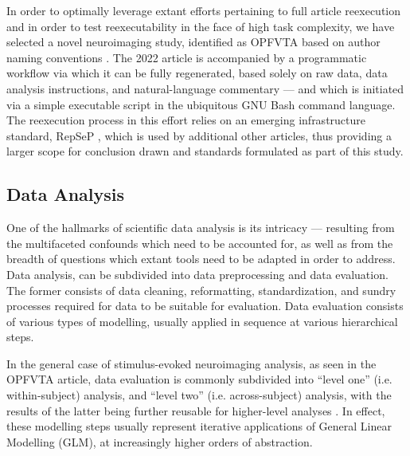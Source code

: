 In order to optimally leverage extant efforts pertaining to full article reexecution and in order to test reexecutability in the face of high task complexity, we have selected a novel neuroimaging study, identified as OPFVTA based on author naming conventions \supercite{opfvta}.
The 2022 article is accompanied by a programmatic workflow via which it can be fully regenerated, based solely on raw data, data analysis instructions, and natural-language commentary — and which is initiated via a simple executable script in the ubiquitous GNU Bash \supercite{bash} command language.
The reexecution process in this effort relies on an emerging infrastructure standard, RepSeP \supercite{repsep}, which is used by additional other articles, thus providing a larger scope for conclusion drawn and standards formulated as part of this study.


\subsection{Data Analysis}

One of the hallmarks of scientific data analysis is its intricacy — resulting from the multifaceted confounds which need to be accounted for, as well as from the breadth of questions which extant tools need to be adapted in order to address.
Data analysis, can be subdivided into data preprocessing and data evaluation.
The former consists of data cleaning, reformatting, standardization, and sundry processes required for data to be suitable for evaluation.
Data evaluation consists of various types of modelling, usually applied in sequence at various hierarchical steps.

In the general case of stimulus-evoked neuroimaging analysis, as seen in the OPFVTA article, data evaluation is commonly subdivided into “level one” (i.e. within-subject) analysis, and “level two” (i.e. across-subject) analysis, with the results of the latter being further reusable for higher-level analyses \supercite{Friston1995}.
In effect, these modelling steps usually represent iterative applications of General Linear Modelling (GLM), at increasingly higher orders of abstraction.

